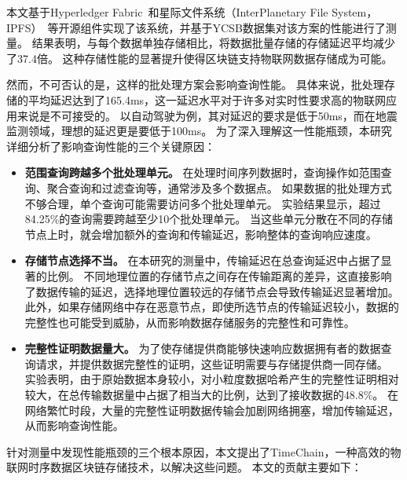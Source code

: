 本文基于Hyperledger Fabric~\cite{hyperledger}和星际文件系统（InterPlanetary File System，IPFS）~\cite{benet2014ipfs}等开源组件实现了该系统，并基于YCSB数据集对该方案的性能进行了测量。
结果表明，与每个数据单独存储相比，将数据批量存储的存储延迟平均减少了37.4倍。
这种存储性能的显著提升使得区块链支持物联网数据存储成为可能。

然而，不可否认的是，这样的批处理方案会影响查询性能。
具体来说，批处理存储的平均延迟达到了165.4ms，这一延迟水平对于许多对实时性要求高的物联网应用来说是不可接受的。
以自动驾驶为例，其对延迟的要求是低于50ms，而在地震监测领域，理想的延迟更是要低于100ms。
为了深入理解这一性能瓶颈，本研究详细分析了影响查询性能的三个关键原因：

\begin{itemize}
    \item \textbf{范围查询跨越多个批处理单元。}
    在处理时间序列数据时，查询操作如范围查询、聚合查询和过滤查询等，通常涉及多个数据点。
    如果数据的批处理方式不够合理，单个查询可能需要访问多个批处理单元。
    实验结果显示，超过84.25\%的查询需要跨越至少10个批处理单元。
    当这些单元分散在不同的存储节点上时，就会增加额外的查询和传输延迟，影响整体的查询响应速度。
    
    \item \textbf{存储节点选择不当。}
    在本研究的测量中，传输延迟在总查询延迟中占据了显著的比例。
    不同地理位置的存储节点之间存在传输距离的差异，这直接影响了数据传输的延迟，选择地理位置较远的存储节点会导致传输延迟显著增加。
    此外，如果存储网络中存在恶意节点，即使所选节点的传输延迟较小，数据的完整性也可能受到威胁，从而影响数据存储服务的完整性和可靠性。

    \item \textbf{完整性证明数据量大。}
    为了使存储提供商能够快速响应数据拥有者的数据查询请求，并提供数据完整性的证明，这些证明需要与存储提供商一同存储。
    实验表明，由于原始数据本身较小，对小粒度数据哈希产生的完整性证明相对较大，在总传输数据量中占据了相当大的比例，达到了接收数据的48.8\%。
    在网络繁忙时段，大量的完整性证明数据传输会加剧网络拥塞，增加传输延迟，从而影响查询性能。
\end{itemize}

针对测量中发现性能瓶颈的三个根本原因，本文提出了TimeChain，一种高效的物联网时序数据区块链存储技术，以解决这些问题。
本文的贡献主要如下：

